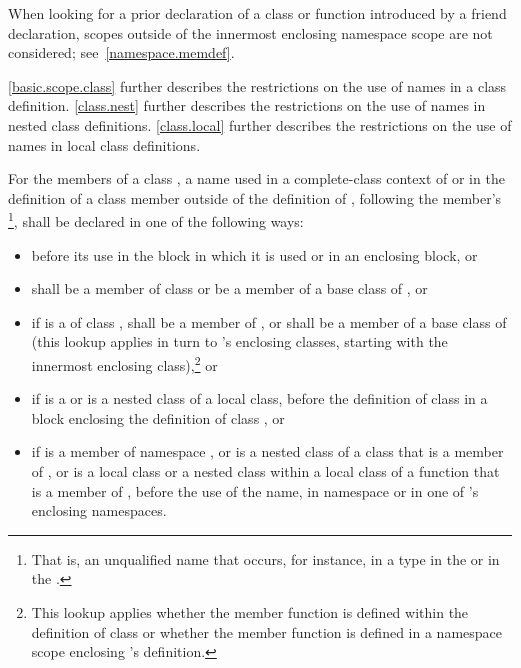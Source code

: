 \begin{note}
When looking for a prior declaration of a class
or function introduced by a friend declaration, scopes outside
of the innermost enclosing namespace scope are not considered;
see~\ref{namespace.memdef}.
\end{note}
\begin{note}
\ref{basic.scope.class}
further describes the restrictions on the use of names in a class
definition. \ref{class.nest} further describes the restrictions on the
use of names in nested class definitions. \ref{class.local} further
describes the restrictions on the use of names in local class
definitions.
\end{note}

\pnum
For the members of a class , a name used
in a complete-class context of  or
in the definition of a class member outside of the definition of ,
following the member's
\footnote{That is, an unqualified name that occurs,
for instance, in a
type in the
 or in the
.}, shall be declared in one of the
following ways:
\begin{itemize}
\item before its use in the block in which it is used or in an enclosing
block, or

\item shall be a member of class  or be a member of a base
class of , or

\item if 
is a  of class , shall be a
member of , or shall be a member of a base class of 
(this lookup applies in turn to 's enclosing classes, starting
with the innermost enclosing class),\footnote{This lookup applies whether
the member function is defined
within the definition of class  or whether the member function
is defined in a namespace scope enclosing 's definition.}
or

\item if  is a  or is a nested
class of a local class, before the definition of class  in a
block enclosing the definition of class , or

\item if  is a member of namespace , or is a nested
class of a class that is a member of , or is a local class or a
nested class within a local class of a function that is a member of
, before the use of the name, in namespace 
or in one of 's enclosing namespaces.
\end{itemize}
